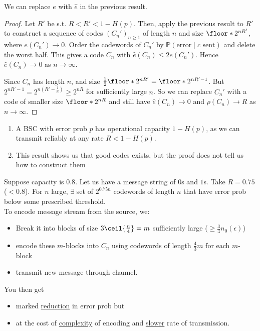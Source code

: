 \begin{proposition}
    We can replace $e$ with $\hat e$ in the previous result.
\end{proposition}

\begin{proof}
    Let $R'$ be s.t. $R < R' < 1 - H(p)$.
    Then, apply the previous result to $R'$ to construct a sequence of codes $(C_n')_{n \geq 1}$ of length $n$ and size $\floor*{2^{nR'}}$, where $e(C_n') \to 0$.
    Order the codewords of $C_n'$ by $\mathbb{P}(\text{error} \mid c \text{ sent})$ and delete the worst half.
    This gives a code $C_n$ with $\hat e(C_n) \leq 2 e(C_n')$.
    Hence $\hat e(C_n) \to 0$ as $n \to \infty$.

    Since $C_n$ has length $n$, and size $\frac{1}{2} \floor*{2^{nR'}} = \floor*{2^{nR' - 1}}$.
    But $2^{nR' - 1} = 2^{n(R' - \frac{1}{n})} \geq 2^{nR}$ for sufficiently large $n$.
    So we can replace $C_n'$ with a code of smaller size $\floor*{2^{nR}}$ and still have $\hat e(C_n) \to 0$ and $\rho(C_n) \to R$ as $n \to \infty$.
\end{proof}

\begin{remark}
    \begin{enumerate}
        \item A BSC with error prob $p$ has operational capacity $1 - H(p)$, as we can transmit reliably at any rate $R < 1 - H(p)$.
        \item This result shows us that good codes exists, but the proof does not tell us how to construct them
    \end{enumerate}
\end{remark}

\begin{example}
    Suppose capacity is $0.8$.
    Let us have a message string of $0$s and $1$s.
    Take $R = 0.75$ ($< 0.8$).
    For $n$ large, $\exists$ set of $2^{0.75n}$ codewords of length $n$ that have error prob below some prescribed threshold. \\
    To encode message stream from the source, we:
    \begin{itemize}
        \item Break it into blocks of size $3 \ceil{\frac{n}{4}} = m$ sufficiently large ($\geq \frac{3}{4} n_0(\epsilon)$)
        \item encode these $m$-blocks into $C_n$ using codewords of length $\frac{4}{3} m$ for each $m$-block
        \item transmit new message through channel.
    \end{itemize}
    You then get
    \begin{itemize}
        \item marked \underline{reduction} in error prob but
        \item at the cost of \underline{complexity} of encoding and \underline{slower} rate of transmission.
    \end{itemize}
\end{example}

